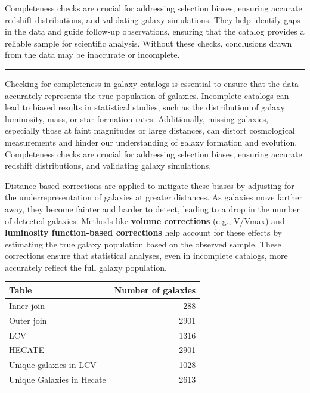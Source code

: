 \documentclass[
]{article}
\begin{document}
Completeness checks are crucial for addressing selection biases,
ensuring accurate redshift distributions, and validating galaxy
simulations. They help identify gaps in the data and guide follow-up
observations, ensuring that the catalog provides a reliable sample for
scientific analysis. Without these checks, conclusions drawn from the
data may be inaccurate or incomplete.

\begin{center}\rule{0.5\linewidth}{0.5pt}\end{center}

Checking for completeness in galaxy catalogs is essential to ensure that
the data accurately represents the true population of galaxies.
Incomplete catalogs can lead to biased results in statistical studies,
such as the distribution of galaxy luminosity, mass, or star formation
rates. Additionally, missing galaxies, especially those at faint
magnitudes or large distances, can distort cosmological measurements and
hinder our understanding of galaxy formation and evolution. Completeness
checks are crucial for addressing selection biases, ensuring accurate
redshift distributions, and validating galaxy simulations.

Distance-based corrections are applied to mitigate these biases by
adjusting for the underrepresentation of galaxies at greater distances.
As galaxies move farther away, they become fainter and harder to detect,
leading to a drop in the number of detected galaxies. Methods like
\textbf{volume corrections} (e.g., V/Vmax) and \textbf{luminosity
function-based corrections} help account for these effects by estimating
the true galaxy population based on the observed sample. These
corrections ensure that statistical analyses, even in incomplete
catalogs, more accurately reflect the full galaxy population.

\begin{longtable}[]{@{}lr@{}}
\toprule\noalign{}
Table & Number of galaxies \\
\midrule\noalign{}
\endhead
\bottomrule\noalign{}
\endlastfoot
Inner join & 288 \\
Outer join & 2901 \\
LCV & 1316 \\
HECATE & 2901 \\
Unique galaxies in LCV & 1028 \\
Unique Galaxies in Hecate & 2613 \\
\end{longtable}
\end{document}
